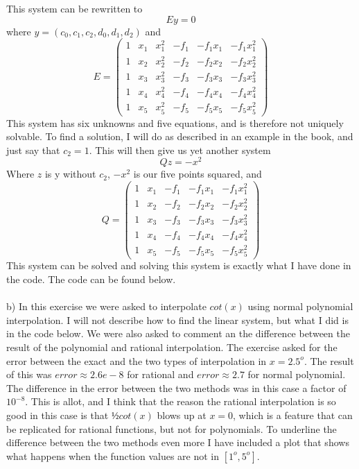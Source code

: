 \documentclass[11pt,a4paper]{report}
\begin{document}
This system can be rewritten to $$Ey=0$$ where $y = (c_0,c_1,c_2,d_0,d_1,d_2)$ and 
$$
E = 
 \begin{pmatrix}
  1 & x_1 & x_1^2 & -f_1 & -f_1x_1 & -f_1x_1^2  \\
  1 & x_2 & x_2^2 & -f_2 & -f_2x_2 & -f_2x_2^2  \\
  1 & x_3 & x_3^2 & -f_3 & -f_3x_3 & -f_3x_3^2   \\
  1 & x_4 & x_4^2 & -f_4 & -f_4x_4 & -f_4x_4^2 \\
  1 & x_5 & x_5^2 & -f_5 & -f_5x_5 & -f_5x_5^2
 \end{pmatrix}
$$
This system has six unknowns and five equations, and is therefore not uniquely solvable. To find a solution, I will do as described in an example in the book, and just say that $c_2=1$. This will then give us yet another system $$Qz=-x^2$$ Where $z$ is y without $c_2$, $-x^2$ is our five points squared, and 
$$
Q = 
 \begin{pmatrix}
  1 & x_1 &  -f_1 & -f_1x_1 & -f_1x_1^2  \\
  1 & x_2 &  -f_2 & -f_2x_2 & -f_2x_2^2  \\
  1 & x_3 &  -f_3 & -f_3x_3 & -f_3x_3^2   \\
  1 & x_4 &  -f_4 & -f_4x_4 & -f_4x_4^2 \\
  1 & x_5 &  -f_5 & -f_5x_5 & -f_5x_5^2
 \end{pmatrix}
$$
This system can be solved and solving this system is exactly what I have done in the code. The code can be found below.
\\
\\
b) In this exercise we were asked to interpolate $cot(x)$ using normal polynomial interpolation. I will not describe how to find the linear system, but what I did is in the code below. We were also asked to comment an the difference between the result of the polynomial and rational interpolation. The exercise asked for the error between the exact and the two types of interpolation in $x=2.5^o$. The result of this was $error\approx2.6e-8 $ for rational and $error\approx2.7 $ for normal polynomial. The difference in the error between the two methods was in this case a factor of $10^{-8}$. This is allot, and I think that the reason the rational interpolation is so good in this case is that $½cot(x)$ blows up at $x=0$, which is a feature that can be replicated for rational functions, but not for polynomials. To underline the difference between the two methods even more I have included a plot that shows what happens when the function values are not in $[1^o,5^o]$.
\end{document}
